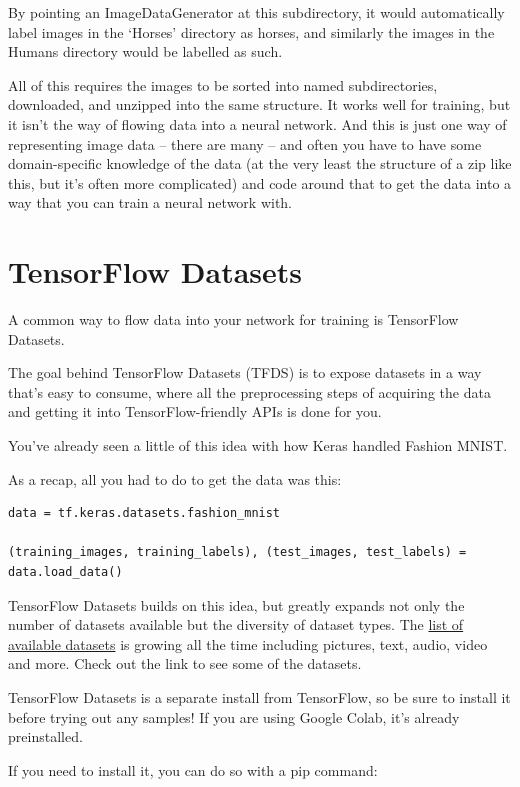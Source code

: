 By pointing an ImageDataGenerator at this subdirectory, it would automatically label images in the ‘Horses’ directory as horses, and similarly the images in the Humans directory would be labelled as such.

All of this requires the images to be sorted into named subdirectories, downloaded, and unzipped into the same structure. It works well for training, but it isn’t the way of flowing data into a neural network. And this is just one way of representing image data -- there are many -- and often you have to have some domain-specific knowledge of the data (at the very least the structure of a zip like this, but it’s often more complicated) and code around that to get the data into a way that you can train a neural network with.

\section{TensorFlow Datasets}

A common way to flow data into your network for training is TensorFlow Datasets.

The goal behind TensorFlow Datasets (TFDS) is to expose datasets in a way that’s easy to consume, where all the preprocessing steps of acquiring the data and getting it into TensorFlow-friendly APIs is done for you.

You’ve already seen a little of this idea with how Keras handled Fashion MNIST.

As a recap, all you had to do to get the data was this:

\begin{lstlisting}
data = tf.keras.datasets.fashion_mnist

(training_images, training_labels), (test_images, test_labels) = data.load_data()
\end{lstlisting}

TensorFlow Datasets builds on this idea, but greatly expands not only the number of datasets available but the diversity of dataset types. The \href{https://www.tensorflow.org/datasets/catalog/overview}{list of available datasets} is growing all the time including pictures, text, audio, video and more. Check out the link to see some of the datasets.

TensorFlow Datasets is a separate install from TensorFlow, so be sure to install it before trying out any samples! If you are using Google Colab, it’s already preinstalled.

If you need to install it, you can do so with a pip command:

